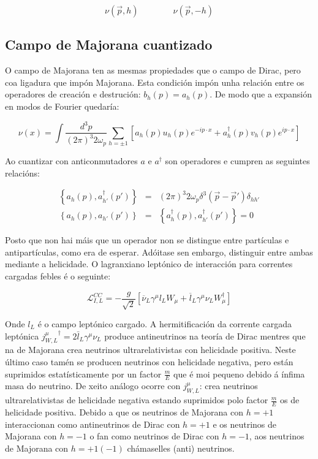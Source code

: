 \documentclass[a4paper,10pt]{article}
\newcommand{\beq}{\begin{equation}}
\newcommand{\eeq}{\end{equation}}
\newcommand{\bea}{\begin{eqnarray}}
\newcommand{\eea}{\end{eqnarray}}
\newcommand{\barra}[1]{\overline{#1}}
\newcommand{\h}[1]{#1^\dagger}
\newcommand{\ac}[2]{\left\{ #1 , #2 \right\}}
\newcommand{\rvec}[1]{\overrightarrow{#1}}
\newcommand{\chula}[1]{\mathcal{#1}}
\begin{document}
\beq
\nu ( \rvec p , h) \qquad \qquad \nu ( \rvec p , -h )
\eeq

\subsection{Campo de Majorana cuantizado}

O campo de Majorana ten as mesmas propiedades que o campo de Dirac, pero coa ligadura que impón Majorana. Esta condición impón unha relación entre os operadores de creación e destrución: $b_h (p) = a_h (p)$. De modo que a expansión en modos de Fourier quedaría:

\beq
\nu (x) = \int \frac{d^3 p}{ (2\pi)^3 2 \omega_p} \sum_{h= \pm 1} \left[ a_h (p) u_h (p) e^{-i p \cdot x} + \h a_h (p) v_h (p) e^{i p \cdot x} \right]
\eeq

Ao cuantizar con anticonmutadores $a$ e $\h a$ son operadores e cumpren as seguintes relacións:

\bea
\ac{a_h (p)}{\h a_{h'} (p')} &=& (2\pi)^3 2\omega_p \delta^3 (\rvec p - \rvec p') \delta_{hh'} \\
\ac{a_h (p)}{a_{h'} (p')} &=& \ac{\h a_h (p)}{\h a_{h'} (p')} = 0
\eea

Posto que non hai máis que un operador non se distingue entre partículas e antipartículas, como era de esperar. Adóitase sen embargo, distinguir entre ambas mediante a helicidade. O lagranxiano leptónico de interacción para correntes cargadas febles é o seguinte:

\beq
\chula L_{I,L}^{CC} = - \frac{g}{\sqrt{2}} \left[ \barra\nu_L \gamma^\mu l_L W_\mu + \barra l_L \gamma^\mu \nu_L \h W_\mu \right]
\eeq

Onde $l_L$ é o campo leptónico cargado. A hermitificación da corrente cargada leptónica ${j_{W,L}^\mu}^\dag = 2 \bar l_L \gamma^\mu \nu_L$ produce antineutrinos na teoría de Dirac mentres que na de Majorana crea neutrinos ultrarelativistas con helicidade positiva. Neste último caso tamén se producen neutrinos con helicidade negativa, pero están suprimidos estatísticamente por un factor $\frac{m}{E}$ que é moi pequeno debido á ínfima masa do neutrino. De xeito análogo ocorre con $j_{W,L}^\mu$: crea neutrinos ultrarelativistas de helicidade negativa estando suprimidos polo factor $\frac{m}{E}$ os de helicidade positiva. Debido a que os neutrinos de Majorana con $h=+1$ interaccionan como antineutrinos de Dirac con $h=+1$ e os neutrinos de Majorana con $h=-1$ o fan como neutrinos de Dirac con $h=-1$, aos neutrinos de Majorana con $h=+1(-1)$ chámaselles (anti) neutrinos.
\end{document}
